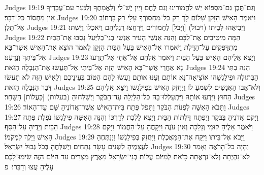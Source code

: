 Judges 19:19	וְגַם־תֶּבֶן גַּם־מִסְפּוֹא יֵשׁ לַחֲמוֹרֵינוּ וְגַם לֶחֶם וָיַיִן יֶשׁ־לִי וְלַאֲמָתֶךָ וְלַנַּעַר עִם־עֲבָדֶיךָ אֵין מַחְסוֹר כּל־דָּבָר׃
Judges 19:20	וַיֹּאמֶר הָאִישׁ הַזָּקֵן שָׁלוֹם לָךְ רַק כּל־מַחְסוֹרְךָ עָלָי רַק בָּרְחוֹב אַל־תָּלַן׃
Judges 19:21	וַיְבִיאֵהוּ לְבֵיתוֹ (ויבול) [וַיָּבל] לַחֲמוֹרִים וַיִּרְחֲצוּ רַגְלֵיהֶם וַיֹּאכְלוּ וַיִּשְׁתּוּ׃
Judges 19:22	הֵמָּה מֵיטִיבִים אֶת־לִבָּם וְהִנֵּה אַנְשֵׁי הָעִיר אַנְשֵׁי בְנֵי־בְלִיַּעַל נָסַבּוּ אֶת־הַבַּיִת מִתְדַּפְּקִים עַל־הַדָּלֶת וַיֹּאמְרוּ אֶל־הָאִישׁ בַּעַל הַבַּיִת הַזָּקֵן לֵאמֹר הוֹצֵא אֶת־הָאִישׁ אֲשֶׁר־בָּא אֶל־בֵּיתְךָ וְנֵדָעֶנּוּ׃
Judges 19:23	וַיֵּצֵא אֲלֵיהֶם הָאִישׁ בַּעַל הַבַּיִת וַיֹּאמֶר אֲלֵהֶם אַל־אַחַי אַל־תָּרֵעוּ נָא אַחֲרֵי אֲשֶׁר־בָּא הָאִישׁ הַזֶּה אֶל־בֵּיתִי אַל־תַּעֲשׂוּ אֶת־הַנְּבָלָה הַזֹּאת׃
Judges 19:24	הִנֵּה בִתִּי הַבְּתוּלָה וּפִילַגְשֵׁהוּ אוֹצִיאָה־נָּא אוֹתָם וְעַנּוּ אוֹתָם וַעֲשׂוּ לָהֶם הַטּוֹב בְּעֵינֵיכֶם וְלָאִישׁ הַזֶּה לֹא תַעֲשׂוּ דְּבַר הַנְּבָלָה הַזֹּאת׃
Judges 19:25	וְלֹא־אָבוּ הָאֲנָשִׁים לִשְׁמֹעַ לוֹ וַיַּחֲזֵק הָאִישׁ בְּפִילַגְשׁוֹ וַיֹּצֵא אֲלֵיהֶם הַחוּץ וַיֵּדְעוּ אוֹתָהּ וַיִּתְעַלְּלוּ־בָהּ כּל־הַלַּיְלָה עַד־הַבֹּקֶר וַיְשַׁלְּחוּהָ (בעלות) [כַּעֲלוֹת] הַשָּׁחַר׃
Judges 19:26	וַתָּבֹא הָאִשָּׁה לִפְנוֹת הַבֹּקֶר וַתִּפֹּל פֶּתַח בֵּית־הָאִישׁ אֲשֶׁר־אֲדוֹנֶיהָ שָּׁם עַד־הָאוֹר׃
Judges 19:27	וַיָּקם אֲדֹנֶיהָ בַּבֹּקֶר וַיִּפְתַּח דַּלְתוֹת הַבַּיִת וַיֵּצֵא לָלֶכֶת לְדַרְכּוֹ וְהִנֵּה הָאִשָּׁה פִילַגְשׁוֹ נֹפֶלֶת פֶּתַח הַבַּיִת וְיָדֶיהָ עַל־הַסַּף׃
Judges 19:28	וַיֹּאמֶר אֵלֶיהָ קוּמִי וְנֵלֵכָה וְאֵין עֹנֶה וַיִּקָּחֶהָ עַל־הַחֲמוֹר וַיָּקם הָאִישׁ וַיֵּלֶךְ לִמְקֹמוֹ׃
Judges 19:29	וַיָּבֹא אֶל־בֵּיתוֹ וַיִּקַּח אֶת־הַמַּאֲכֶלֶת וַיַּחֲזֵק בְּפִילַגְשׁוֹ וַיְנַתְּחֶהָ לַעֲצָמֶיהָ לִשְׁנֵים עָשָׂר נְתָחִים וַיְשַׁלְּחֶהָ בְּכֹל גְּבוּל יִשְׂרָאֵל׃
Judges 19:30	וְהָיָה כל־הָרֹאֶה וְאָמַר לֹא־נִהְיְתָה וְלֹא־נִרְאֲתָה כָּזֹאת לְמִיּוֹם עֲלוֹת בְּנֵי־יִשְׂרָאֵל מֵאֶרֶץ מִצְרַיִם עַד הַיּוֹם הַזֶּה שִׂימוּ־לָכֶם עָלֶיהָ עֻצוּ וְדַבֵּרוּ׃ {פ}
